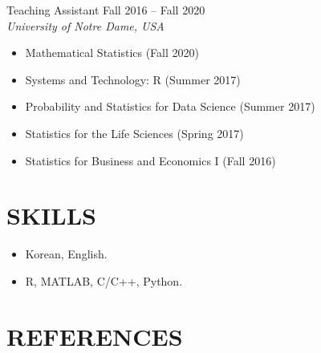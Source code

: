 \documentclass[margin, 10pt]{res} %
\begin{document}
\begin{resume}
Teaching Assistant \hfill Fall 2016 -- Fall 2020 \\
{\sl University of Notre Dame, USA}
\begin{itemize} \itemsep -2pt
	\item Mathematical Statistics (Fall 2020)
	\item Systems and Technology: R (Summer 2017)
	\item Probability and Statistics for Data Science (Summer 2017)
	\item Statistics for the Life Sciences (Spring 2017)
	\item Statistics for Business and Economics I (Fall 2016)
\end{itemize}

\vspace{.2cm}



\section{\sf SKILLS} 
\begin{itemize} \itemsep -1pt
	\item{ Korean, English.}
	\item{ R, MATLAB, C/C++, Python.}
\end{itemize}
\vspace{.2cm}





\section{\sf REFERENCES} 


\end{resume}
\end{document}
